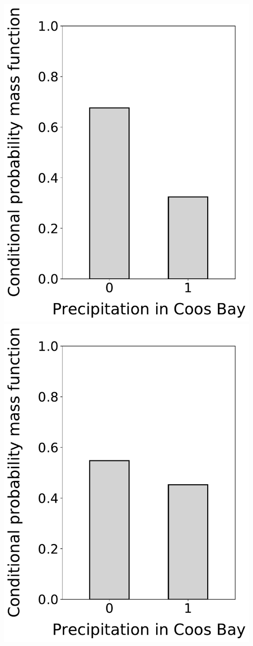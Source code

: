 \documentclass[12pt,twoside]{article}
\begin{document}
\begin{enumerate}
\includegraphics[scale=.5]{precipitation_cond_pmf_2_given_1eq0_3eq1.pdf}
\includegraphics[scale=.5]{precipitation_cond_pmf_2_given_1eq1.pdf}

\end{enumerate}
\end{document}
